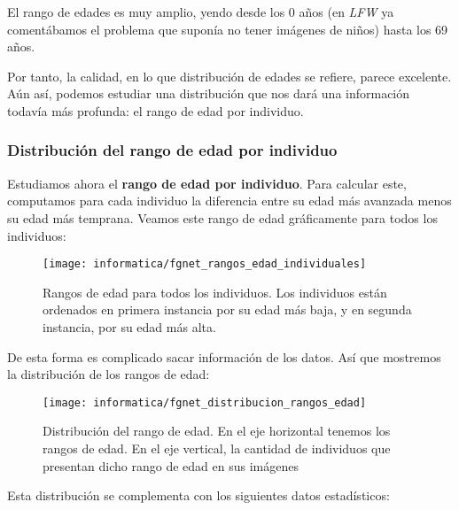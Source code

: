 El rango de edades es muy amplio, yendo desde los 0 años (en \textit{LFW} ya comentábamos el problema que suponía no tener imágenes de niños) hasta los 69 años.

Por tanto, la calidad, en lo que distribución de edades se refiere, parece excelente. Aún así, podemos estudiar una distribución que nos dará una información todavía más profunda: el rango de edad por individuo.

\subsubsection{Distribución del rango de edad por individuo} \label{isubsubs:fgnet_rango_edades}

Estudiamos ahora el \textbf{rango de edad por individuo}. Para calcular este, computamos para cada individuo la diferencia entre su edad más avanzada menos su edad más temprana. Veamos este rango de edad gráficamente para todos los individuos:

\begin{figure}[H]
    \centering
    \texttt{[image: informatica/fgnet\_rangos\_edad\_individuales]}
    \caption{Rangos de edad para todos los individuos. Los individuos están ordenados en primera instancia por su edad más baja, y en segunda instancia, por su edad más alta.}
    \label{img:fgnet_rangos_individuales}
\end{figure}

De esta forma es complicado sacar información de los datos. Así que mostremos la distribución de los rangos de edad:

\begin{figure}[H]
    \centering
    \texttt{[image: informatica/fgnet\_distribucion\_rangos\_edad]}
    \caption{Distribución del rango de edad. En el eje horizontal tenemos los rangos de edad. En el eje vertical, la cantidad de individuos que presentan dicho rango de edad en sus imágenes}
    \label{img:fgnet_rangos_distribucion}
\end{figure}

Esta distribución se complementa con los siguientes datos estadísticos:

